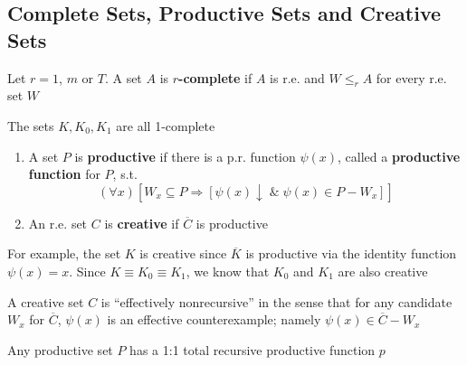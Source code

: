 \documentclass[11pt]{article}
\begin{document}
\subsection{Complete Sets, Productive Sets and Creative Sets}
\label{sec:orged127d2}
\begin{definition}[]
Let \(r=1\), \(m\) or \(T\). A set \(A\) is \textbf{\(r\)-complete} if \(A\) is r.e.
and \(W\le_r A\) for every r.e. set \(W\)
\end{definition}

\begin{theorem}[]
\label{thm2.4.2}
The sets \(K,K_0,K_1\) are all 1-complete
\end{theorem}

\begin{definition}[]
\begin{enumerate}
\item A set \(P\) is \textbf{productive} if there is a p.r. function \(\psi(x)\),
called a \textbf{productive function} for \(P\), s.t.
\begin{equation*}
(\forall x)[W_x\subseteq P\Longrightarrow[\psi(x)\downarrow\;
\&\;\psi(x)\in P-W_x]]
\end{equation*}
\item An r.e. set \(C\) is \textbf{creative} if \(\overbar{C}\) is productive
\end{enumerate}
\end{definition}

For example, the set \(K\) is creative since \(\overbar{K}\) is productive
via the identity function \(\psi(x)=x\). Since \(K\equiv K_0\equiv K_1\), we
know that \(K_0\) and \(K_1\) are also creative

A creative set \(C\) is ``effectively nonrecursive'' in the sense that for any
candidate \(W_x\) for \(\overbar{C}\), \(\psi(x)\) is an effective
counterexample; namely \(\psi(x)\in\overbar{C}-W_x\)

\begin{theorem}[]
Any productive set \(P\) has a 1:1 total recursive productive function \(p\)
\end{theorem}
\end{document}
